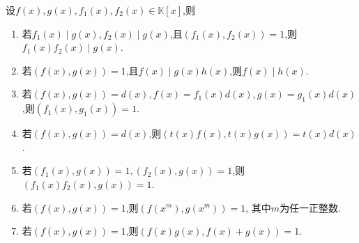 \documentclass[../../main.tex]{subfiles}%
\begin{document}
\begin{proposition}[互素多项式和最大公因式的基本性质]\label{proposition:互素多项式和最大公因式的基本性质}
设$f(x),g(x),f_1(x),f_2(x)\in \mathbb{K}[x]$,则
\begin{enumerate}[(1)]
\item\label{proposition:互素多项式和最大公因式的基本性质-1} 若\(f_1(x)\mid g(x), f_2(x)\mid g(x)\),且\((f_1(x), f_2(x)) = 1\),则\(f_1(x)f_2(x)\mid g(x)\).
\item  若\((f(x), g(x)) = 1\),且\(f(x)\mid g(x)h(x)\),则\(f(x)\mid h(x)\).
\item  若\((f(x), g(x)) = d(x), f(x)=f_1(x)d(x), g(x)=g_1(x)d(x)\),则\((f_1(x), g_1(x)) = 1\).
\item  若\((f(x), g(x)) = d(x)\),则\((t(x)f(x), t(x)g(x)) = t(x)d(x)\).
\item\label{proposition:互素多项式和最大公因式的基本性质6}  若\((f_1(x), g(x)) = 1, (f_2(x), g(x)) = 1\),则\((f_1(x)f_2(x), g(x)) = 1\).

\item 若\((f(x),g(x))=1\),则\((f(x^m),g(x^m))=1\), 其中\(m\)为任一正整数.

\item  若\((f(x),g(x)) = 1\),则\((f(x)g(x),f(x)+g(x)) = 1\).
\end{enumerate}
\end{proposition}
\end{document}
